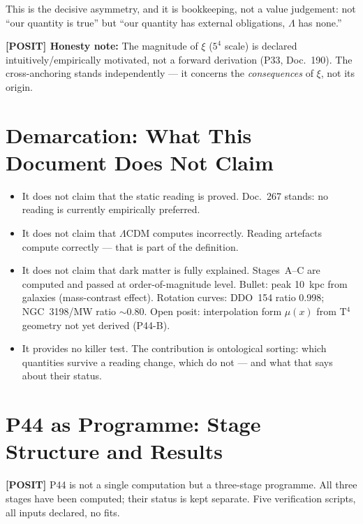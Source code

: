 \documentclass[11pt]{report}
\begin{document}
This is the decisive asymmetry, and it is bookkeeping, not a value
judgement: not ``our quantity is true'' but ``our quantity has external
obligations, $\Lambda$ has none.''

\medskip
\noindent\textbf{[POSIT] Honesty note:} The magnitude of $\xi$
($5^4$ scale) is declared intuitively/empirically motivated, not a
forward derivation (P33, Doc.~190). The cross-anchoring stands
independently — it concerns the \emph{consequences} of $\xi$, not
its origin.

\chapter{Demarcation: What This Document Does Not Claim}

\begin{itemize}
  \item It does not claim that the static reading is proved.
        Doc.~267 stands: no reading is currently empirically preferred.
  \item It does not claim that $\Lambda$CDM computes incorrectly.
        Reading artefacts compute correctly — that is part of the
        definition.
  \item It does not claim that dark matter is fully explained.
        Stages~A–C are computed and passed at order-of-magnitude level.
        Bullet: peak 10~kpc from galaxies (mass-contrast effect).
        Rotation curves: DDO~154 ratio 0.998; NGC~3198/MW ratio $\sim$0.80.
        Open posit: interpolation form $\mu(x)$ from T$^4$ geometry
        not yet derived (P44-B).
  \item It provides no killer test. The contribution is ontological
        sorting: which quantities survive a reading change, which do not
        — and what that says about their status.
\end{itemize}

\chapter{P44 as Programme: Stage Structure and Results}

\textbf{[POSIT]} P44 is not a single computation but a three-stage
programme. All three stages have been computed; their status is kept
separate. Five verification scripts, all inputs declared, no fits.
\end{document}
